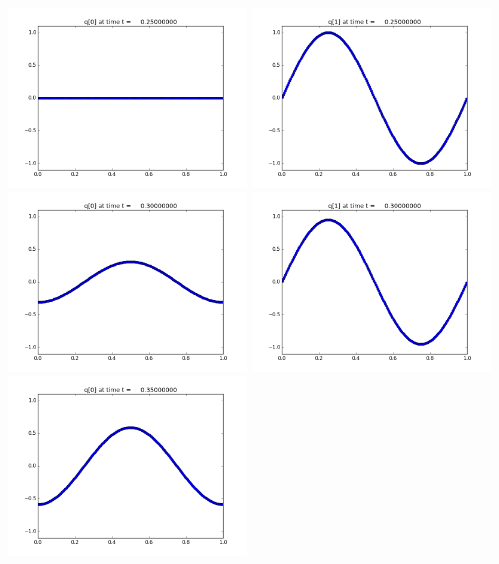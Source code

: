 \documentclass[11pt]{article}
\begin{document}
\vskip 10pt 
\includegraphics[width=0.475\textwidth]{frame0005fig0.png}
\includegraphics[width=0.475\textwidth]{frame0005fig1.png}
\vskip 10pt 
\includegraphics[width=0.475\textwidth]{frame0006fig0.png}
\includegraphics[width=0.475\textwidth]{frame0006fig1.png}
\vskip 10pt 
\includegraphics[width=0.475\textwidth]{frame0007fig0.png}
\end{document}
